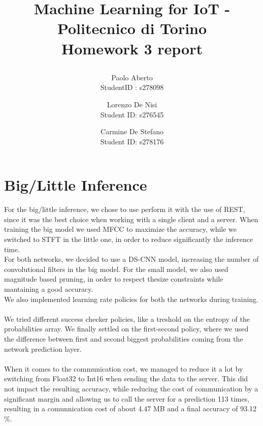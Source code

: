 \documentclass{article}
\date{}
\begin{document}
\author{Paolo Aberto\\
StudentID : s278098\\

\and
Lorenzo De Nisi\\
Student ID: s276545\\

\and
Carmine De Stefano\\
Student ID: s278176\\
}

\justifying

\title{
    \vspace{0.4cm}
    
    Machine Learning for IoT - 
    Politecnico di Torino\\
    \vspace{.5cm}
    \Large \textbf{Homework 3 report}
    \vspace{.1cm}
}

\maketitle
\thispagestyle{empty} 
\vspace{-0.9cm}


\section{Big/Little Inference}
For the big/little inference, we chose to use perform it with the use of REST, since it was the best choice when working with a single client and a server.
When training the big model we used MFCC to maximize the accuracy, while we switched to STFT in the little one, in order to reduce significantly the inference time.
\\
For both networks, we decided to use a DS-CNN model, increasing the number of convolutional filters in the big model. For the small model, we also used magnitude based pruning, in order to respect thesize constraints while mantaining a good accuracy.\\
We also implemented learning rate policies for both the networks during training.\\\\
We tried different success checker policies, like a treshold on the entropy of the probabilities array. We finally settled on the first-second policy, where we used the difference between first and second biggest probabilities coming from the network prediction layer.
\\\\
When it comes to the communication cost, we managed to reduce it a lot by switching from Float32 to Int16 when sending the data to the server. This did not impact the resulting accuracy, while reducing the cost of communication by a significant margin and allowing us to call the server for a prediction 113 times, resulting in a comunnication cost of about 4.47 MB and a final accuracy of 93.12 \%.
\vspace{0.2cm}
\end{document}
